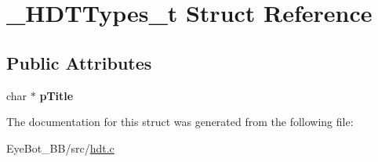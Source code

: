 \hypertarget{struct___h_d_t_types__t}{\section{\-\_\-\-H\-D\-T\-Types\-\_\-t \-Struct \-Reference}
\label{struct___h_d_t_types__t}
}
\subsection*{\-Public \-Attributes}
\begin{DoxyCompactItemize}
\item 
\hypertarget{struct___h_d_t_types__t_a715c5be24cb40e15ebaea8db4f055794}{char $\ast$ {\bfseries p\-Title}}\label{struct___h_d_t_types__t_a715c5be24cb40e15ebaea8db4f055794}

\end{DoxyCompactItemize}


\-The documentation for this struct was generated from the following file\-:\begin{DoxyCompactItemize}
\item 
\-Eye\-Bot\-\_\-\-B\-B/src/\hyperlink{hdt_8c}{hdt.\-c}\end{DoxyCompactItemize}
